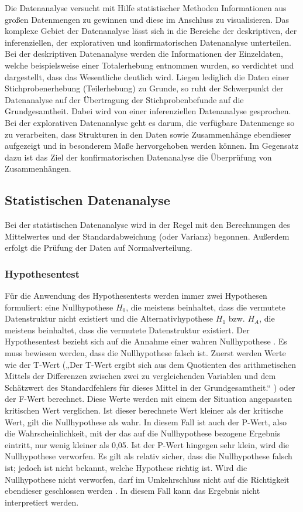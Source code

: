 Die Datenanalyse versucht mit Hilfe statistischer Methoden Informationen aus großen Datenmengen zu gewinnen und diese im Anschluss zu visualisieren. Das komplexe Gebiet der Datenanalyse lässt sich in die Bereiche der deskriptiven, der inferenziellen, der explorativen und konfirmatorischen Datenanalyse unterteilen. Bei der deskriptiven Datenanalyse werden die Informationen der Einzeldaten, welche beispielsweise einer Totalerhebung entnommen wurden, so verdichtet und dargestellt, dass das Wesentliche deutlich wird. Liegen lediglich die Daten einer Stichprobenerhebung (Teilerhebung) zu Grunde, so ruht der Schwerpunkt der Datenanalyse auf der Übertragung der Stichprobenbefunde auf die Grundgesamtheit. Dabei wird von einer inferenziellen Datenanalyse gesprochen. Bei der explorativen Datenanalyse geht es darum, die verfügbare Datenmenge so zu verarbeiten, dass Strukturen in den Daten sowie Zusammenhänge ebendieser aufgezeigt und in besonderem Maße hervorgehoben werden können. Im Gegensatz dazu ist das Ziel der konfirmatorischen Datenanalyse die Überprüfung von Zusammenhängen.

\subsection{Statistischen Datenanalyse}

Bei der statistischen Datenanalyse wird in der Regel mit den Berechnungen des Mittelwertes und der Standardabweichung (oder Varianz) begonnen. Außerdem erfolgt die Prüfung der Daten auf Normalverteilung.

\subsubsection{Hypothesentest}

Für die Anwendung des Hypothesentests werden immer zwei Hypothesen formuliert: eine Nullhypothese $H_0$, die meistens beinhaltet, dass die vermutete Datenstruktur nicht existiert und die Alternativhypothese $H_1$ bzw. $H_A$, die meistens beinhaltet, dass die vermutete Datenstruktur existiert. Der Hypothesentest bezieht sich auf die Annahme einer wahren Nullhypothese \cite{Akremi:2011}. Es muss bewiesen werden, dass die Nullhypothese falsch ist. Zuerst werden Werte wie der T-Wert („Der T-Wert ergibt sich aus dem Quotienten des arithmetischen Mittels der Differenzen zwischen zwei zu vergleichenden Variablen und dem Schätzwert des Standardfehlers für dieses Mittel in der Grundgesamtheit.“ \cite{Akremi:2011}) oder der F-Wert berechnet. Diese Werte werden mit einem der Situation angepassten kritischen Wert verglichen. Ist dieser berechnete Wert kleiner als der kritische Wert, gilt die Nullhypothese als wahr. In diesem Fall ist auch der P-Wert, also die Wahrscheinlichkeit, mit der das auf die Nullhypothese bezogene Ergebnis eintritt, nur wenig kleiner als 0,05. Ist der P-Wert hingegen sehr klein, wird die Nullhypothese verworfen. Es gilt als relativ sicher, dass die Nullhypothese falsch ist; jedoch ist nicht bekannt, welche Hypothese richtig ist. Wird die Nullhypothese nicht verworfen, darf im Umkehrschluss nicht auf die Richtigkeit ebendieser geschlossen werden \cite{Akremi:2011}. In diesem Fall kann das Ergebnis nicht interpretiert werden.

